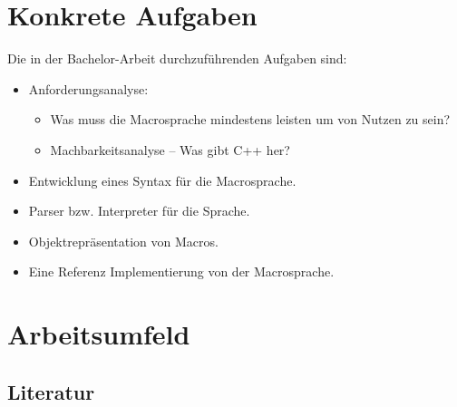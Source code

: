 \section{Konkrete Aufgaben}
\label{sec:konkrete_aufgaben}
  Die in der Bachelor-Arbeit durchzuführenden Aufgaben sind:
  \begin{itemize}
    \item Anforderungsanalyse:
      \begin{itemize}
        \item Was muss die Macrosprache mindestens leisten um von Nutzen zu sein?
        \item Machbarkeitsanalyse -- Was gibt C++ her?
      \end{itemize}
    \item Entwicklung eines Syntax für die Macrosprache.
    \item Parser bzw. Interpreter für die Sprache.
    \item Objektrepräsentation von Macros.
    \item Eine Referenz Implementierung von der Macrosprache.
  \end{itemize}

\section{Arbeitsumfeld}
\label{sec:arbeitsumfeld}

  \subsection{Literatur}
  \label{ssec:literatur}
    \nocite{*}
    \printbibliography


